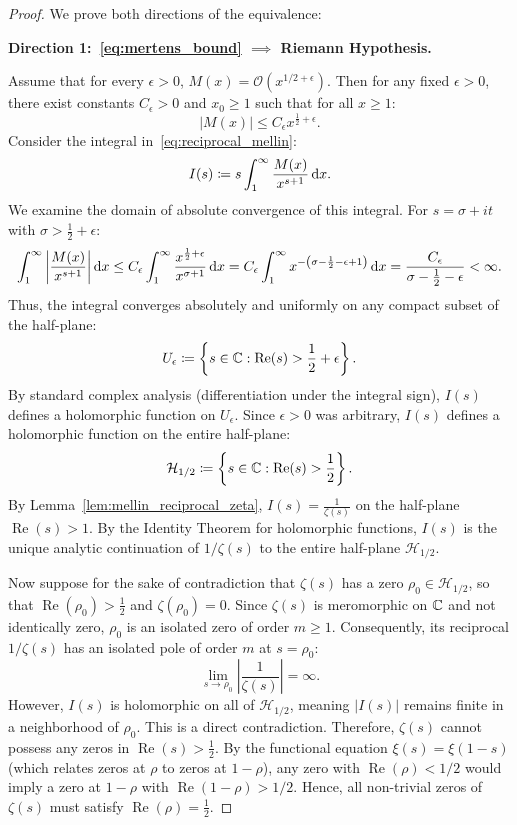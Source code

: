 \begin{proof}
\leanok
We prove both directions of the equivalence:

\medskip
\noindent
\textbf{Direction 1:~\eqref{eq:mertens_bound} $\implies$ Riemann Hypothesis.}

Assume that for every $\epsilon > 0$, $M(x) = \mathcal{O}(x^{1/2 + \epsilon})$. Then for any fixed $\epsilon > 0$, there exist constants $C_\epsilon > 0$ and $x_0 \ge 1$ such that for all $x \ge 1$:
$$|M(x)| \le C_\epsilon x^{\frac{1}{2} + \epsilon}.$$
Consider the integral in~\eqref{eq:reciprocal_mellin}:
$$I(s) \coloneqq s \int_1^\infty \frac{M(x)}{x^{s+1}} \, \mathrm{d} x.$$
We examine the domain of absolute convergence of this integral. For $s = \sigma + i t$ with $\sigma > \frac{1}{2} + \epsilon$:
$$\int_1^\infty \left| \frac{M(x)}{x^{s+1}} \right| \mathrm{d} x \le C_\epsilon \int_1^\infty \frac{x^{\frac{1}{2} + \epsilon}}{x^{\sigma+1}} \, \mathrm{d} x = C_\epsilon \int_1^\infty x^{-\left(\sigma - \frac{1}{2} - \epsilon + 1\right)} \, \mathrm{d} x = \frac{C_\epsilon}{\sigma - \frac{1}{2} - \epsilon} < \infty.$$
Thus, the integral converges absolutely and uniformly on any compact subset of the half-plane:
$$U_\epsilon \coloneqq \left\{ s \in \mathbb{C} : \operatorname{Re}(s) > \frac{1}{2} + \epsilon \right\}.$$
By standard complex analysis (differentiation under the integral sign), $I(s)$ defines a holomorphic function on $U_\epsilon$. Since $\epsilon > 0$ was arbitrary, $I(s)$ defines a holomorphic function on the entire half-plane:
$$\mathcal{H}_{1/2} \coloneqq \left\{ s \in \mathbb{C} : \operatorname{Re}(s) > \frac{1}{2} \right\}.$$
By Lemma~\ref{lem:mellin_reciprocal_zeta}, $I(s) = \frac{1}{\zeta(s)}$ on the half-plane $\operatorname{Re}(s) > 1$. By the Identity Theorem for holomorphic functions, $I(s)$ is the unique analytic continuation of $1/\zeta(s)$ to the entire half-plane $\mathcal{H}_{1/2}$.

Now suppose for the sake of contradiction that $\zeta(s)$ has a zero $\rho_0 \in \mathcal{H}_{1/2}$, so that $\operatorname{Re}(\rho_0) > \frac{1}{2}$ and $\zeta(\rho_0) = 0$. Since $\zeta(s)$ is meromorphic on $\mathbb{C}$ and not identically zero, $\rho_0$ is an isolated zero of order $m \ge 1$. Consequently, its reciprocal $1/\zeta(s)$ has an isolated pole of order $m$ at $s = \rho_0$:
$$\lim_{s \to \rho_0} \left| \frac{1}{\zeta(s)} \right| = \infty.$$
However, $I(s)$ is holomorphic on all of $\mathcal{H}_{1/2}$, meaning $|I(s)|$ remains finite in a neighborhood of $\rho_0$. This is a direct contradiction.
Therefore, $\zeta(s)$ cannot possess any zeros in $\operatorname{Re}(s) > \frac{1}{2}$.
By the functional equation $\xi(s) = \xi(1-s)$ (which relates zeros at $\rho$ to zeros at $1 - \rho$), any zero with $\operatorname{Re}(\rho) < 1/2$ would imply a zero at $1 - \rho$ with $\operatorname{Re}(1 - \rho) > 1/2$.
Hence, all non-trivial zeros of $\zeta(s)$ must satisfy $\operatorname{Re}(\rho) = \frac{1}{2}$.


\end{proof}

